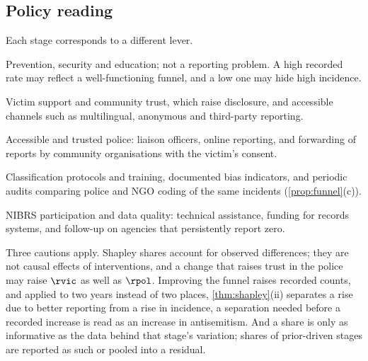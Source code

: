 \subsection{Policy reading}\label{sec:funnel-policy}

Each stage corresponds to a different lever.
\begin{description}[leftmargin=1.2em,style=nextline]
  \item[Incidence ($\theta$).] Prevention, security and education; not a reporting problem. A high recorded rate may reflect a well-functioning funnel, and a low one may hide high incidence.
  \item[Reaching a channel ($\rvic$).] Victim support and community trust, which raise disclosure, and accessible channels such as multilingual, anonymous and third-party reporting.
  \item[Police reporting ($\rpol$).] Accessible and trusted police: liaison officers, online reporting, and forwarding of reports by community organisations with the victim's consent.
  \item[Classification ($\rcls$).] Classification protocols and training, documented bias indicators, and periodic audits comparing police and NGO coding of the same incidents (\cref{prop:funnel}(c)).
  \item[Submission ($\rsub$).] NIBRS participation and data quality: technical assistance, funding for records systems, and follow-up on agencies that persistently report zero.
\end{description}
Three cautions apply. Shapley shares account for observed differences; they are not causal effects of interventions, and a change that raises trust in the police may raise $\rvic$ as well as $\rpol$. Improving the funnel raises recorded counts, and applied to two years instead of two places, \cref{thm:shapley}(ii) separates a rise due to better reporting from a rise in incidence, a separation needed before a recorded increase is read as an increase in antisemitism. And a share is only as informative as the data behind that stage's variation; shares of prior-driven stages are reported as such or pooled into a residual.
